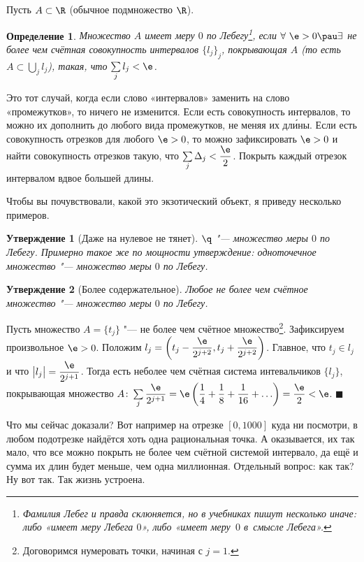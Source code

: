 \documentclass[a4paper,10pt,twoside]{article}
\newtheorem{Def}{Определение}[section]
\newtheorem{Ut}{Утверждение}[section]
\newenvironment{Proof}
       {\par\noindent{\textbf{Доказательство.}}}
       {\hfill$\scriptstyle\blacksquare$}
\begin{document}
 Пусть $A\subset \R$ (обычное подмножество $\R$).
 \begin{Def}
 	Множество $A$ имеет меру $0$ по Лебегу\footnote{Фамилия Лебег и правда склюняется, но в учебниках пишут несколько иначе: либо «имеет меру Лебега $0$», либо «имеет меру~$0$ в~смысле Лебега».},
 	 если $\forall\ \e>0\pau\exists$ не более чем счётная совокупность интервалов $\big\{l_j\big\}_j$, 
 	покрывающая $A$ (то есть $A\subset\bigcup\limits_{j}l_j$), такая, что $\sum\limits_j l_j<\e$. 	
 \end{Def}
 
 Это тот случай, когда если слово «интервалов» заменить на слово «промежутков», то ничего не изменится. Если есть совокупность интервалов,
 то можно их дополнить до любого вида промежутков, не меняя их дл\'{и}ны. Если есть совокупность отрезков для любого $\e>0$, то можно зафиксировать
 $\e>0$ и найти совокупность отрезков такую, что $\sum\limits_j \Delta_j<\dfrac{\e}2$. Покрыть каждый отрезок интервалом вдвое большей длины.
 
 Чтобы вы почувствовали, какой это экзотический объект, я приведу несколько примеров.
 \setcounter{Ut}{-2}
 \begin{Ut}[Даже на нулевое не тянет]
 	$\q$ "--- множество меры $0$ по Лебегу. Примерно такое же по мощности утверждение: одноточечное множество "--- множество меры $0$ по Лебегу.
 \end{Ut}
 \setcounter{Ut}{0}
 \begin{Ut}[Более содержательное]
 	Любое не более чем счётное множество "--- множество меры $0$ по Лебегу.
 \end{Ut}
 
 \begin{Proof}
 	Пусть множество $A=\big\{t_j\big\}$ "--- не более чем счётное множество\footnote{Договоримся нумеровать точки, начиная с $j=1$.}. Зафиксируем произвольное $\e>0$. Положим 
 	$l_j=\left(t_j-\dfrac{\e}{2^{j+2}},t_j+\dfrac{\e}{2^{j+2}}\right)$. Главное, что $t_j\in l_j$ и что $\big|l_j\big|=\dfrac{\e}{2^{j+1}}$.
 	Тогда есть неболее чем счётная система интевальчиков $\big\{l_j\big\}$, покрывающая множество $A\colon\sum\limits_j\dfrac{\e}{2^{j+1}}=\e\left(\dfrac14+\dfrac18+\dfrac1{16}+\ldots\right)=\dfrac{\e}2<\e$.
 \end{Proof}
 
 Что мы сейчас доказали? Вот например на отрезке $[0,1000]$ куда ни посмотри, в любом подотрезке найдётся хоть одна рациональная точка. А оказывается, их так мало, что все можно покрыть не 
 более чем счётной системой интервало, да ещё и сумма их длин будет меньше, чем одна миллионная. Отдельный вопрос: как так? Ну вот так. Так жизнь устроена.
 
\end{document}
